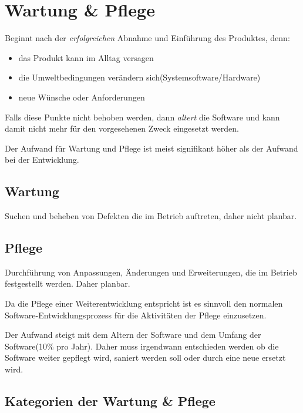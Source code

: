 \documentclass[a4paper]{article}
\theoremstyle{break}
\begin{document}
\section{Wartung \& Pflege}
Beginnt nach der \emph{erfolgreichen} Abnahme und Einführung des Produktes, denn:
\begin{itemize}
\item das Produkt kann im Alltag versagen
\item die Umweltbedingungen verändern sich(Systemsoftware/Hardware)
\item neue Wünsche oder Anforderungen
\end{itemize}

Falls diese Punkte nicht behoben werden, dann \emph{altert} die Software und kann damit nicht mehr für den vorgesehenen Zweck eingesetzt werden.

Der Aufwand für Wartung und Pflege ist meist signifikant höher als der Aufwand bei der Entwicklung.

\subsection{Wartung}
Suchen und beheben von Defekten die im Betrieb auftreten, daher nicht planbar.

\subsection{Pflege}
Durchführung von Anpassungen, Änderungen und Erweiterungen, die im Betrieb festgestellt werden. Daher planbar.

Da die Pflege einer Weiterentwicklung entspricht ist es sinnvoll den normalen Software-Entwicklungsprozess für die Aktivitäten der Pflege einzusetzen.

Der Aufwand steigt mit dem Altern der Software und dem Umfang der Software(10\% pro Jahr). Daher muss irgendwann entschieden werden ob die Software weiter gepflegt wird, saniert werden soll oder durch eine neue ersetzt wird.

\subsection{Kategorien der Wartung \& Pflege}
\end{document}
